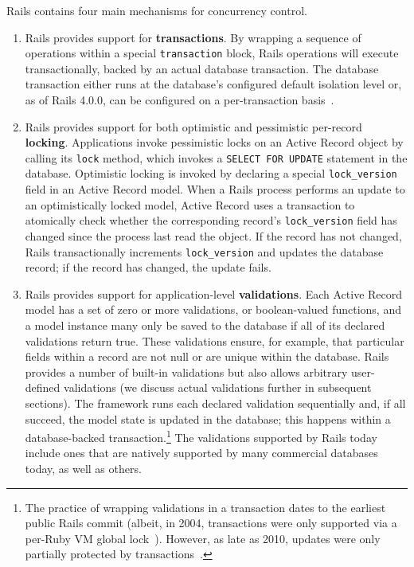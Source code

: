 Rails contains four main mechanisms for concurrency control.

\begin{enumerate}
\item Rails provides support for \textbf{transactions}. By wrapping a
sequence of operations within a special \texttt{transaction} block,
Rails operations will execute transactionally, backed by an actual
database transaction. The database transaction either runs at the
database's configured default isolation level or, as of Rails 4.0.0, can
be configured on a per-transaction
basis~\cite{code-transaction-isolation}.

\item Rails provides support for both optimistic and pessimistic
  per-record \textbf{locking}. Applications invoke pessimistic locks
  on an Active Record object by calling its \texttt{lock} method,
  which invokes a \texttt{SELECT FOR UPDATE} statement in the
  database. Optimistic locking is invoked by declaring a special
  \texttt{lock\_version} field in an Active Record model. When a Rails
  process performs an update to an optimistically locked model, Active
  Record uses a transaction to atomically check whether the corresponding record's
  \texttt{lock\_version} field has changed since the process last read
  the object. If the record has not changed, Rails transactionally increments
  \texttt{lock\_version} and updates the database record; if the
  record has changed, the update fails.

\item Rails provides support for application-level
  \textbf{validations}. Each Active Record model has a set of zero or more
  validations, or boolean-valued functions, and a model instance many
  only be saved to the database if all of its declared validations
  return true. These validations ensure, for example, that particular
  fields within a record are not null or are unique
  within the database. Rails provides a number of built-in validations
  but also allows arbitrary user-defined validations (we discuss
  actual validations further in subsequent sections). The framework
  runs each declared validation sequentially and, if all succeed, the
  model state is updated in the database; this happens within a
  database-backed transaction.\footnote{The practice of wrapping
    validations in a transaction dates to the earliest public Rails
    commit (albeit, in 2004, transactions were only supported via a
    per-Ruby VM global lock~\cite{code-txn-lock}). However, as late as
    2010, updates were only partially protected by
    transactions~\cite{code-txn-update}.} The validations supported by
  Rails today include ones that are natively supported by many
  commercial databases today, as well as others.\\[-2mm]


\end{enumerate}
